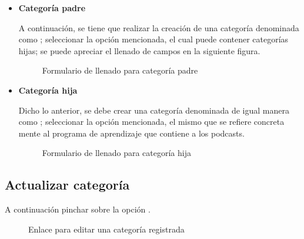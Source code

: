 \begin{itemize}

\item \textbf{Categoría padre}

A continuación, se tiene que realizar la creación de una categoría denominada
como ; seleccionar la opción mencionada, el cual puede
contener categorías hijas; se puede apreciar el llenado de campos en la
siguiente figura.

\begin{figure}[!ht]
\centering
		\caption{Formulario de llenado para categoría padre}
\end{figure}

\item \textbf{Categoría hija}

Dicho lo anterior, se debe crear una categoría denominada de igual manera como
; seleccionar la opción mencionada, el mismo que se
refiere concreta mente al programa de aprendizaje que contiene a los podcasts.

\begin{figure}[!ht]
\centering
		\caption{Formulario de llenado para categoría hija}
\end{figure}
\end{itemize}


 \subsection{Actualizar categoría}

A continuación pinchar sobre la opción .

\begin{figure}[!ht]
\centering
		\caption{Enlace para editar una categoría registrada}
\end{figure}

